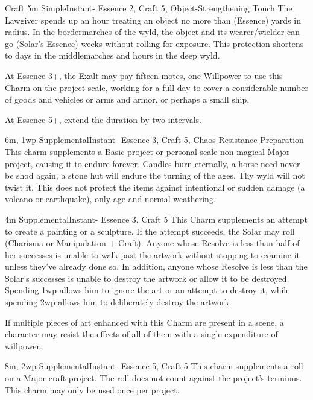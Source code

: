 \begin{Ability}{Craft}
  {5m}
  {Simple}{Instant}{-}
  {Essence 2, Craft 5, Object-Strengthening Touch}
  The Lawgiver spends up an hour treating an object no more than (Essence) yards in radius. In the bordermarches of the wyld, the object and its wearer/wielder can go (Solar's Essence) weeks without rolling for exposure. This protection shortens to days in the middlemarches and hours in the deep wyld.

  At Essence 3+, the Exalt may pay fifteen motes, one Willpower to use this Charm on the project scale, working for a full day to cover a considerable number of goods and vehicles or arms and armor, or perhaps a small ship.

  At Essence 5+, extend the duration by two intervals.

  {6m, 1wp}
  {Supplemental}{Instant}{-}
  {Essence 3, Craft 5, Chaos-Resistance Preparation}
  This charm supplements a Basic project or personal-scale non-magical Major project, causing it to endure forever. Candles burn eternally, a horse need never be shod again, a stone hut will endure the turning of the ages. Thy wyld will not twist it. This does not protect the items against intentional or sudden damage (a volcano or earthquake), only age and normal weathering.

  {4m}
  {Supplemental}{Instant}{-}
  {Essence 3, Craft 5}
  This Charm supplements an attempt to create a painting or a sculpture. If the attempt succeeds, the Solar may roll (Charisma or Manipulation + Craft). Anyone whose Resolve is less than half of her successes is unable to walk past the artwork without stopping to examine it unless they've already done so. In addition, anyone whose Resolve is less than the Solar's successes is unable to destroy the artwork or allow it to be destroyed. Spending 1wp allows him to ignore the art or an attempt to destroy it, while spending 2wp allows him to deliberately destroy the artwork.

  If multiple pieces of art enhanced with this Charm are present in a scene, a character may resist the effects of all of them with a single expenditure of willpower.

  {8m, 2wp}
  {Supplemental}{Instant}{-}
  {Essence 5, Craft 5}
  This charm supplements a roll on a Major craft project. The roll does not count against the project's terminus. This charm may only be used once per project.
\end{Ability}

